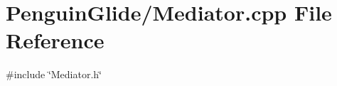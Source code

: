 \section{Penguin\+Glide/\+Mediator.cpp File Reference}
\label{_mediator_8cpp}
{\ttfamily \#include \char`\"{}Mediator.\+h\char`\"{}}\newline
